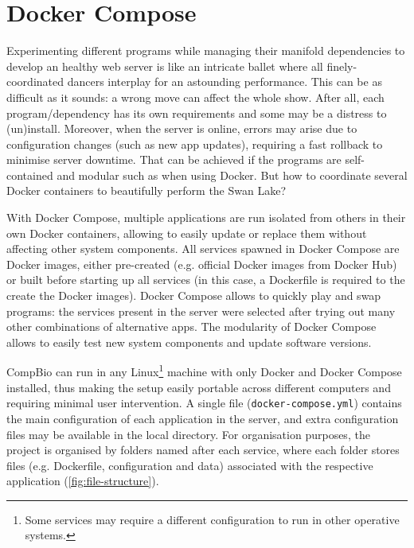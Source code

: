 \section{Docker Compose}

Experimenting different programs while managing their manifold dependencies to develop an healthy web server is like an intricate ballet where all finely-coordinated dancers interplay for an astounding performance. This can be as difficult as it sounds: a wrong move can affect the whole show. After all, each program/dependency has its own requirements and some may be a distress to (un)install. Moreover, when the server is online, errors may arise due to configuration changes (such as new app updates), requiring a fast rollback to minimise server downtime. That can be achieved if the programs are self-contained and modular such as when using Docker. But how to coordinate several Docker containers to beautifully perform the Swan Lake?

With Docker Compose, multiple applications are run isolated from others in their own Docker containers, allowing to easily update or replace them without affecting other system components. All services spawned in Docker Compose are Docker images, either pre-created (e.g. official Docker images from Docker Hub) or built before starting up all services (in this case, a Dockerfile is required to the create the Docker images). Docker Compose allows to quickly play and swap programs: the services present in the server were selected after trying out many other combinations of alternative apps. The modularity of Docker Compose allows to easily test new system components and update software versions.

CompBio can run in any Linux\footnote{Some services may require a different configuration to run in other operative systems.} machine with only Docker and Docker Compose installed, thus making the setup easily portable across different computers and requiring minimal user intervention. A single file (\texttt{docker-compose.yml}) contains the main configuration of each application in the server, and extra configuration files may be available in the local directory. For organisation purposes, the project is organised by folders named after each service, where each folder stores files (e.g. Dockerfile, configuration and data) associated with the respective application (\autoref{fig:file-structure}).

